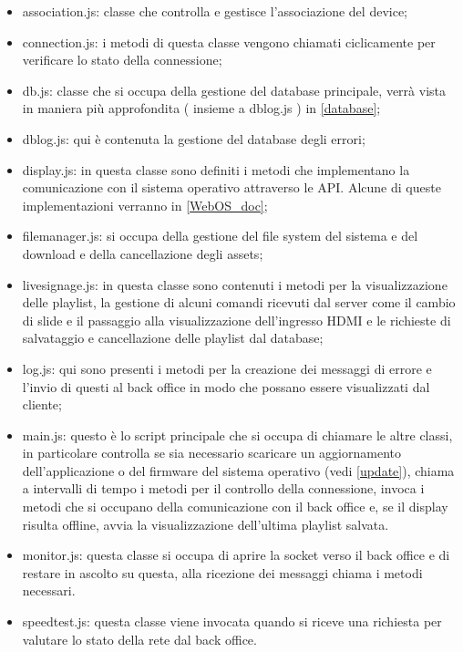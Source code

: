 \begin{itemize}
    \item association.js: classe che controlla e gestisce l'associazione del device;
    \item connection.js: i metodi di questa classe vengono chiamati ciclicamente per verificare lo stato della connessione;
    \item db.js: classe che si occupa della gestione del database principale, verrà vista in maniera più approfondita ( insieme a dblog.js ) in \ref*{database};
    \item dblog.js: qui è contenuta la gestione del database degli errori;
    \item display.js: in questa classe sono definiti i metodi che implementano la comunicazione con il sistema operativo attraverso le API. Alcune di queste implementazioni verranno  in \ref*{WebOS_doc};
    \item filemanager.js: si occupa della gestione del file system del sistema e del download e della cancellazione degli assets;
    \item livesignage.js: in questa classe sono contenuti i metodi per la visualizzazione delle playlist, la gestione di alcuni comandi ricevuti dal server come il cambio di slide e il passaggio alla visualizzazione dell'ingresso HDMI e le richieste di salvataggio e cancellazione delle playlist dal database;
    \item log.js: qui sono presenti i metodi per la creazione dei messaggi di errore e l'invio di questi al back office in modo che possano essere visualizzati dal cliente;
    \item main.js: questo è lo script principale che si occupa di chiamare le altre classi, in particolare controlla se sia necessario scaricare un aggiornamento dell'applicazione o del firmware del sistema operativo (vedi \ref*{update}), chiama a intervalli di tempo i metodi per il controllo della connessione, invoca i metodi che si occupano della comunicazione con il back office e, se il display risulta offline, avvia la visualizzazione dell'ultima playlist salvata.
    \item monitor.js: questa classe si occupa di aprire la socket verso il back office e di restare in ascolto su questa, alla ricezione dei messaggi chiama i metodi necessari.
    \item speedtest.js: questa classe viene invocata quando si riceve una richiesta per valutare lo stato della rete dal back office.
\end{itemize}

